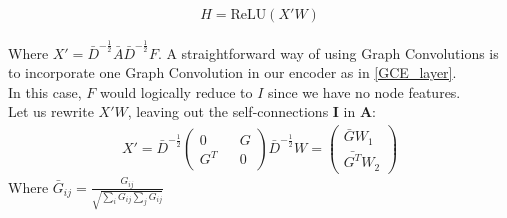 \documentclass{report}
\begin{document}
	\begin{align}
	H = \text{ReLU}(X'W)
	\end{align}
	
	Where $X' = \bar{D}^{-\frac{1}{2}}\bar{A}\bar{D}^{-\frac{1}{2}}F$. A straightforward way of using Graph Convolutions is to incorporate one Graph Convolution in our encoder as in \ref{GCE_layer}. \\ In this case, $F$ would logically reduce to $I$ since we have no node features. \\
	Let us rewrite $X'W$, leaving out the self-connections $\mathbf{I}$ in $\mathbf{A}$: 
	\begin{align}
	X' = \bar{D}^{-\frac{1}{2}}
	\left( \begin{matrix} 
	0 && G \\
	G^T && 0
	\end{matrix} \right) \bar{D}^{-\frac{1}{2}}W = 
	\left(\begin{matrix}
	\bar{G}W_1 \\
	\bar{G^T}W_2
	\end{matrix}\right)\label{highlow}  
	\end{align}
	Where $\bar{G}_{ij} = 
	\frac{G_{ij}}{\sqrt{\sum_i G_{ij} \sum_{j} G_{ij}}}$ 
	
\end{document}

